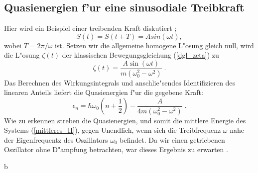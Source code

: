     \subsection{Quasienergien f'ur eine sinusodiale Treibkraft}
      Hier wird ein Beispiel einer treibenden Kraft diskutiert \cite{haenggi};
      \begin{equation}
        S(t) = S(t+T) = Asin(\omega t),
      \end{equation}
      wobei $T=2\pi / \omega$ ist.
      Setzen wir die allgemeine homogene L"osung gleich null, wird die L"osung $\zeta(t)$ der klassischen Bewegungsgleichung (\ref{dgl_zeta}) zu \cite{mads}
      \begin{equation}
        \zeta(t) = \frac{A\sin(\omega t)}{m(\omega_0^2 - \omega^2)} \; .
      \end{equation}
      Das Berechnen des Wirkungsintegrals und anschlie"sendes Identifizieren des linearen Anteils liefert die Quasienergien f"ur die gegebene Kraft:
      \begin{equation}
        \epsilon_n  = \hbar \omega_0(n+\frac{1}{2}) - \frac{A}{4m(\omega_0^2-\omega^2)} \;.
      \end{equation}
      Wie zu erkennen streben die Quasienergien, und somit die mittlere Energie des Systems (\ref{mittleres_H}), gegen Unendlich, wenn sich die Treibfrequenz $\omega$ nahe der Eigenfrequentz des Oszillators $\omega_0 $ befindet.
      Da wir einen getriebenen Oszillator ohne D"ampfung betrachten, war dieses Ergebnis zu erwarten \cite{mads}.



























  b
